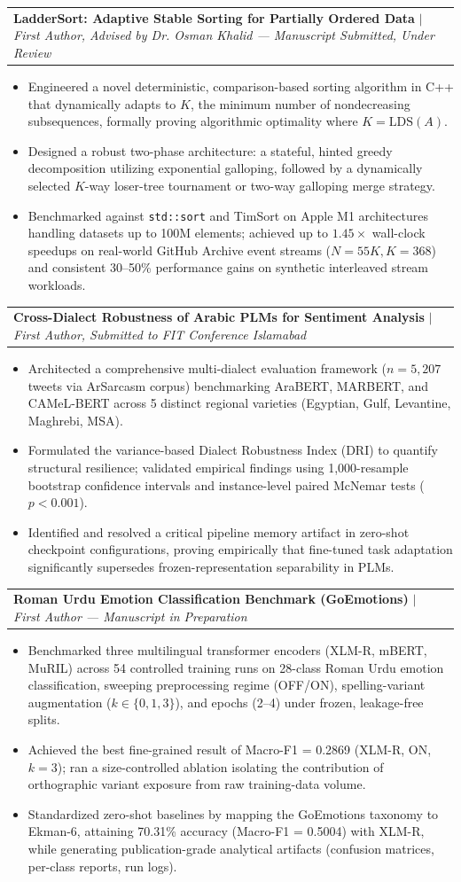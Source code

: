 \documentclass[letterpaper,11pt]{article}
\newcommand{\resumeItem}[1]{
  \item\small{
    {#1 \vspace{-2pt}}
  }
}
\newcommand{\resumeProjectHeading}[2]{
    \item
    \begin{tabularx}{0.97\textwidth}{X r}
      \small#1 & \small #2 \\
    \end{tabularx}\vspace{-6pt}
}
\newcommand{\resumeItemListStart}{\begin{itemize}[leftmargin=0.18in, itemsep=1pt]}
\newcommand{\resumeItemListEnd}{\end{itemize}\vspace{-5pt}}
\begin{document}
      \resumeProjectHeading
          {\textbf{LadderSort: Adaptive Stable Sorting for Partially Ordered Data} $|$ \emph{First Author, Advised by Dr. Osman Khalid --- Manuscript Submitted, Under Review}}{}
        \resumeItemListStart
          \resumeItem{Engineered a novel deterministic, comparison-based sorting algorithm in C++ that dynamically adapts to $K$, the minimum number of nondecreasing subsequences, formally proving algorithmic optimality where $K = \mathrm{LDS}(A)$.}
          \resumeItem{Designed a robust two-phase architecture: a stateful, hinted greedy decomposition utilizing exponential galloping, followed by a dynamically selected $K$-way loser-tree tournament or two-way galloping merge strategy.}
          \resumeItem{Benchmarked against \texttt{std::sort} and TimSort on Apple M1 architectures handling datasets up to 100M elements; achieved up to $1.45\times$ wall-clock speedups on real-world GitHub Archive event streams ($N=55K, K=368$) and consistent 30--50\% performance gains on synthetic interleaved stream workloads.}
        \resumeItemListEnd

      \resumeProjectHeading
          {\textbf{Cross-Dialect Robustness of Arabic PLMs for Sentiment Analysis} $|$ \emph{First Author, Submitted to FIT Conference Islamabad}}{}
        \resumeItemListStart
          \resumeItem{Architected a comprehensive multi-dialect evaluation framework ($n=5,207$ tweets via ArSarcasm corpus) benchmarking AraBERT, MARBERT, and CAMeL-BERT across 5 distinct regional varieties (Egyptian, Gulf, Levantine, Maghrebi, MSA).}
          \resumeItem{Formulated the variance-based Dialect Robustness Index (DRI) to quantify structural resilience; validated empirical findings using 1,000-resample bootstrap confidence intervals and instance-level paired McNemar tests ($p<0.001$).}
          \resumeItem{Identified and resolved a critical pipeline memory artifact in zero-shot checkpoint configurations, proving empirically that fine-tuned task adaptation significantly supersedes frozen-representation separability in PLMs.}
        \resumeItemListEnd

      \resumeProjectHeading
          {\textbf{Roman Urdu Emotion Classification Benchmark (GoEmotions)} $|$ \emph{First Author --- Manuscript in Preparation}}{}
        \resumeItemListStart
          \resumeItem{Benchmarked three multilingual transformer encoders (XLM-R, mBERT, MuRIL) across 54 controlled training runs on 28-class Roman Urdu emotion classification, sweeping preprocessing regime (OFF/ON), spelling-variant augmentation ($k \in \{0,1,3\}$), and epochs (2--4) under frozen, leakage-free splits.}
          \resumeItem{Achieved the best fine-grained result of Macro-F1 = 0.2869 (XLM-R, ON, $k{=}3$); ran a size-controlled ablation isolating the contribution of orthographic variant exposure from raw training-data volume.}
          \resumeItem{Standardized zero-shot baselines by mapping the GoEmotions taxonomy to Ekman-6, attaining 70.31\% accuracy (Macro-F1 = 0.5004) with XLM-R, while generating publication-grade analytical artifacts (confusion matrices, per-class reports, run logs).}
        \resumeItemListEnd
\end{document}
